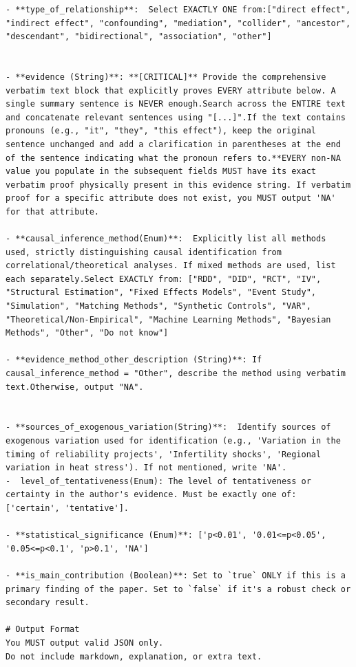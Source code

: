 \begin{tcolorbox}[title={Stage 1 System Prompt}, breakable]
\begin{verbatim}
- **type_of_relationship**:  Select EXACTLY ONE from:["direct effect", "indirect effect", "confounding", "mediation", "collider", "ancestor", "descendant", "bidirectional", "association", "other"]


- **evidence (String)**: **[CRITICAL]** Provide the comprehensive verbatim text block that explicitly proves EVERY attribute below. A single summary sentence is NEVER enough.Search across the ENTIRE text and concatenate relevant sentences using "[...]".If the text contains pronouns (e.g., "it", "they", "this effect"), keep the original sentence unchanged and add a clarification in parentheses at the end of the sentence indicating what the pronoun refers to.**EVERY non-NA value you populate in the subsequent fields MUST have its exact verbatim proof physically present in this evidence string. If verbatim proof for a specific attribute does not exist, you MUST output 'NA' for that attribute.

- **causal_inference_method(Enum)**:  Explicitly list all methods used, strictly distinguishing causal identification from correlational/theoretical analyses. If mixed methods are used, list each separately.Select EXACTLY from: ["RDD", "DID", "RCT", "IV", "Structural Estimation", "Fixed Effects Models", "Event Study", "Simulation", "Matching Methods", "Synthetic Controls", "VAR", "Theoretical/Non-Empirical", "Machine Learning Methods", "Bayesian Methods", "Other", "Do not know"]

- **evidence_method_other_description (String)**: If causal_inference_method = "Other", describe the method using verbatim text.Otherwise, output "NA".


- **sources_of_exogenous_variation(String)**:  Identify sources of exogenous variation used for identification (e.g., 'Variation in the timing of reliability projects', 'Infertility shocks', 'Regional variation in heat stress'). If not mentioned, write 'NA'.
-  level_of_tentativeness(Enum): The level of tentativeness or certainty in the author's evidence. Must be exactly one of: ['certain', 'tentative'].

- **statistical_significance (Enum)**: ['p<0.01', '0.01<=p<0.05', '0.05<=p<0.1', 'p>0.1', 'NA']

- **is_main_contribution (Boolean)**: Set to `true` ONLY if this is a primary finding of the paper. Set to `false` if it's a robust check or secondary result.

# Output Format
You MUST output valid JSON only.
Do not include markdown, explanation, or extra text.

\end{verbatim}
\end{tcolorbox}
